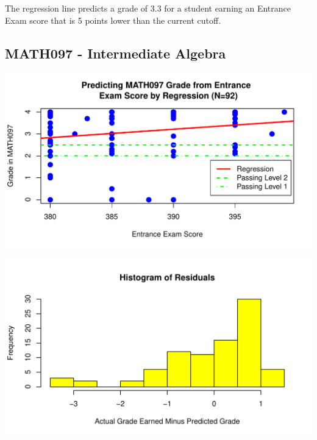 \documentclass[twoside]{article}\usepackage[]{graphicx}\usepackage[]{color}
\makeatletter
\def\maxwidth{ %
  \ifdim\Gin@nat@width>\linewidth
    \linewidth
  \else
    \Gin@nat@width
  \fi
}
\newenvironment{knitrout}{}{} %
\makeatother
\begin{document}
The regression line predicts a grade of 3.3 for a student earning an Entrance Exam score that is 5 points lower than the current cutoff.



\newpage
\subsection{MATH097 - Intermediate Algebra}

%

\begin{knitrout}
\color{fgcolor}
\includegraphics[width=\maxwidth]{figure/097regressiongraph-1} 

\end{knitrout}

\begin{knitrout}
\color{fgcolor}
\includegraphics[width=\maxwidth]{figure/097residualsplot-1} 

\end{knitrout}
\end{document}

